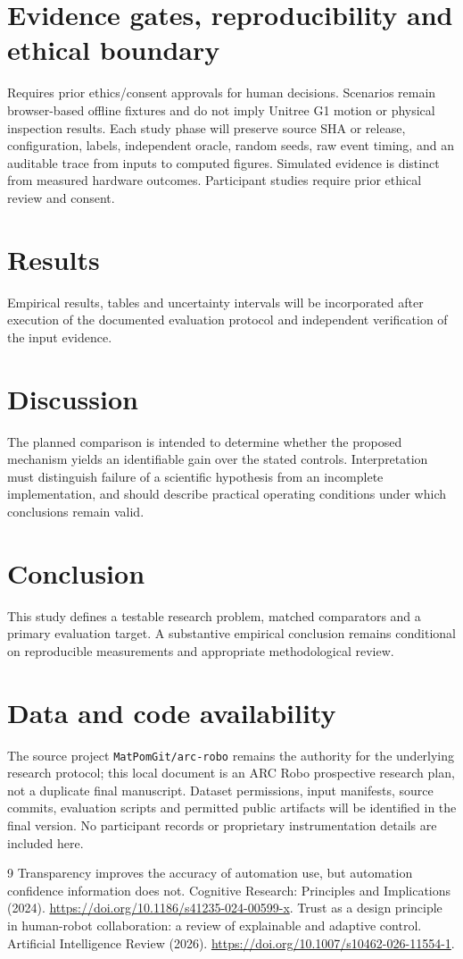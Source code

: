 \documentclass[11pt,a4paper]{article}
\begin{document}
\section{Evidence gates, reproducibility and ethical boundary}
Requires prior ethics/consent approvals for human decisions. Scenarios remain browser-based offline fixtures and do not imply Unitree G1 motion or physical inspection results. Each study phase will preserve source SHA or release, configuration, labels, independent oracle, random seeds, raw event timing, and an auditable trace from inputs to computed figures. Simulated evidence is distinct from measured hardware outcomes. Participant studies require prior ethical review and consent.

\section{Results}
Empirical results, tables and uncertainty intervals will be incorporated after execution of the documented evaluation protocol and independent verification of the input evidence.

\section{Discussion}
The planned comparison is intended to determine whether the proposed mechanism yields an identifiable gain over the stated controls. Interpretation must distinguish failure of a scientific hypothesis from an incomplete implementation, and should describe practical operating conditions under which conclusions remain valid.

\section{Conclusion}
This study defines a testable research problem, matched comparators and a primary evaluation target. A substantive empirical conclusion remains conditional on reproducible measurements and appropriate methodological review.

\section{Data and code availability}
The source project \texttt{MatPomGit/arc-robo} remains the authority for the underlying research protocol; this local document is an ARC Robo prospective research plan, not a duplicate final manuscript. Dataset permissions, input manifests, source commits, evaluation scripts and permitted public artifacts will be identified in the final version. No participant records or proprietary instrumentation details are included here.
\begin{thebibliography}{9}
 Transparency improves the accuracy of automation use, but automation confidence information does not. Cognitive Research: Principles and Implications (2024). \url{https://doi.org/10.1186/s41235-024-00599-x}.
 Trust as a design principle in human-robot collaboration: a review of explainable and adaptive control. Artificial Intelligence Review (2026). \url{https://doi.org/10.1007/s10462-026-11554-1}.
\end{thebibliography}
\end{document}
